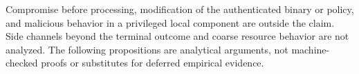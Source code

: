 Compromise before processing, modification of the authenticated binary or
policy, and malicious behavior in a privileged local component are outside the
claim. Side channels beyond the terminal outcome and coarse resource behavior
are not analyzed. The following propositions are analytical arguments, not
machine-checked proofs or substitutes for deferred empirical evidence.
